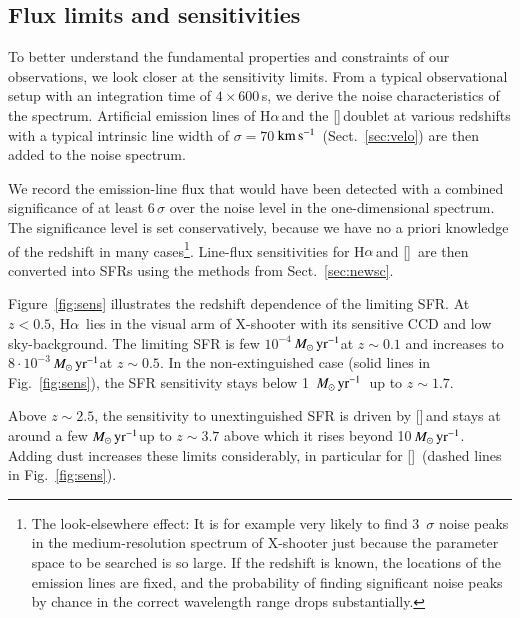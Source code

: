 \documentclass[traditabstract, longauth]{aa}
\newcommand{\kms}{$\rm{km\,s^{-1}}$}
\newcommand{\ha}{H$\alpha$}
\newcommand{\oii}{[\ion{O}{ii}]}
\newcommand{\Msunyr}{$M_\odot\,\rm{yr}^{-1}$}
\begin{document}
\subsection{Flux limits and sensitivities}
\label{sec:sens}

To better understand the fundamental properties and constraints of our observations, we look closer at the sensitivity limits. From a typical observational setup with an integration time of $4\times600$\,s, we derive the noise characteristics of the spectrum. Artificial emission lines of \ha\,and the \oii\,doublet at various redshifts with a typical intrinsic line width of $\sigma= 70$\,\kms\, (Sect.~\ref{sec:velo}) are then added to the noise spectrum. 

We record the emission-line flux that would have been detected with a combined significance of at least 6\,$\sigma$ over the noise level in the one-dimensional spectrum. The significance level is set conservatively, because we have no a priori knowledge of the redshift in many cases\footnote{The look-elsewhere effect: It is for example very likely to find 3~$\sigma$ noise peaks in the medium-resolution spectrum of X-shooter just because the parameter space to be searched is so large. If the redshift is known, the locations of the emission lines are fixed, and the probability of finding significant noise peaks by chance in the correct wavelength range drops substantially.}. Line-flux sensitivities for \ha\,and \oii\, are then converted into SFRs using the methods from Sect.~\ref{sec:newsc}.

Figure~\ref{fig:sens} illustrates the redshift dependence of the limiting SFR. At $z<0.5$, \ha\, lies in the visual arm of X-shooter with its sensitive CCD and low sky-background. The limiting SFR is few $10^{-4}$\,\Msunyr at $z\sim0.1$ and increases to $8\cdot10^{-3}$\,\Msunyr at $z\sim0.5$. In the non-extinguished case (solid lines in Fig.~\ref{fig:sens}), the SFR sensitivity stays below 1~\Msunyr\, up to $z\sim1.7$.

Above $z\sim2.5$, the sensitivity to unextinguished SFR is driven by \oii\,and stays at around a few \Msunyr up to $z\sim3.7$ above which it rises beyond 10\,\Msunyr. Adding dust increases these limits considerably, in particular for \oii\, (dashed lines in Fig.~\ref{fig:sens}). 
\end{document}
